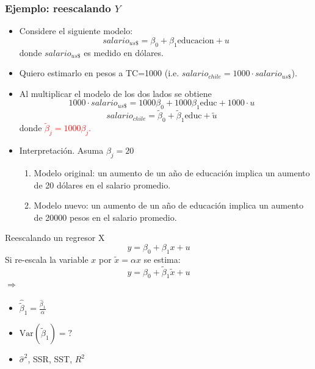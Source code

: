 \documentclass{beamer}
\begin{document}
\begin{frame}
\frametitle{Ejemplo: reescalando \(Y\)}

\begin{itemize}
    \item Considere el siguiente modelo:
    \[
    {salario_{us\$}} = \beta_0 + \beta_1\text{educacion} + u
    \]
    donde ${salario_{us\$}}$ es medido en dólares.
    \item Quiero estimarlo en pesos a TC=1000 (i.e. \({salario_{chile}} = 1000 \cdot {salario_{us\$}}\)).
    \item Al multiplicar el modelo de los dos lados se obtiene
    \[
    1000 \cdot {salario_{us\$}} = 1000 \beta_0 + 1000 \beta_1 \text{educ} + 1000 \cdot u \quad 
    \]
    \[
    {salario_{chile}} = \tilde{\beta}_0 + \tilde{\beta}_1 \text{educ} + \tilde{u} \quad 
    \]
    donde \textcolor{red}{\(\tilde{\beta}_j = 1000 \beta_j\).}
    \item Interpretación. Asuma \(\beta_j = 20\)
    \begin{enumerate}
        \item Modelo original: un aumento de un año de educación implica un aumento de 20 dólares en el salario promedio.
        \item Modelo nuevo: un aumento de un año de educación implica un aumento de 20000 pesos en el salario promedio.
    \end{enumerate}
\end{itemize}
\text{}
\end{frame}


\begin{frame}{Reescalando un regresor X }
            \[ y = \beta_0 + \beta_1 x + u\]
Si re-escala la variable $x$ por $\tilde{x} = \alpha x$ se estima:
            \[ y = \beta_0 + \tilde{\beta}_1 \tilde{x} + u\]
        $\Rightarrow$
        \begin{itemize}
            \item $\hat{\tilde{\beta}}_1 = \frac{\hat{\beta}_1}{\alpha}$
            \item $\text{Var}(\hat{\tilde{\beta}}_1) = ?$%
            \item $\hat{\sigma}^2$, SSR, SST, $R^2$ 
        \end{itemize}
\end{frame}
\end{document}
